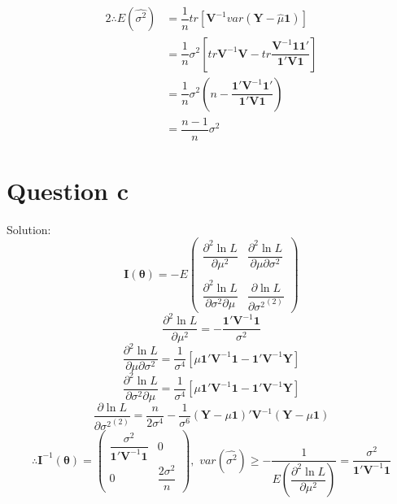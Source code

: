 \documentclass[a4papers]{ctexart}
\begin{document}
\begin{alignat*}{2}
    \therefore 
    E(\hat{\sigma^2})
    &=\dfrac {1}{n} tr\left[ \boldsymbol{V}^{-1}  var\left( \boldsymbol{Y}-\hat {\mu }\boldsymbol{1}\right) \right] \\
    &=\dfrac {1}{n}\sigma ^{2}\left[ tr\boldsymbol{V}^{-1}\boldsymbol{V}-tr\dfrac {\boldsymbol{V}^{-1}\boldsymbol{1}\boldsymbol{1}'}{\boldsymbol{1}'\boldsymbol{V}\boldsymbol{1}}\right] \\
    &=\dfrac{1}{n}\sigma^2\left( n-\dfrac{\boldsymbol{1}'\boldsymbol{V}^{-1}\boldsymbol{1}'}{\boldsymbol{1}'\boldsymbol{V}\boldsymbol{1}} \right)\\
    &= \dfrac{n-1}{n}\sigma^2
\end{alignat*}


\section*{Question c}
\noindent Solution:
\[ \boldsymbol{I}(\boldsymbol{\theta}) = -E \begin{pmatrix}
    \dfrac {\partial ^{2}\ln L}{\partial \mu^2} 
    & \dfrac {\partial^{2}\ln L}{\partial \mu \partial \sigma ^{2}} \\ \\
    \dfrac {\partial ^{2}\ln L}{\partial \sigma ^{2}\partial \mu } 
    & \dfrac {\partial \ln L}{\partial {\sigma ^{2}}^{(2)} }
\end{pmatrix}\]
\[  \dfrac {\partial ^{2}\ln L}{\partial \mu^2 }=-\dfrac {\boldsymbol{1}'\boldsymbol{V}^{-1}\boldsymbol{1}}{\sigma ^{2}} \]
\[ \dfrac {\partial^{2}\ln L}{\partial \mu \partial \sigma ^{2}}=\dfrac {1}{\sigma ^{4}}\left[ \mu \boldsymbol{1}'\boldsymbol{V}^{-1}\boldsymbol{1}-\boldsymbol{1}'\boldsymbol{V}^{-1}\boldsymbol{Y}\right] \]
\[ \dfrac {\partial ^{2}\ln L}{\partial \sigma ^{2}\partial \mu } = \dfrac {1}{\sigma ^{4}}\left[ \mu \boldsymbol{1}'\boldsymbol{V}^{-1}\boldsymbol{1}-\boldsymbol{1}'\boldsymbol{V}^{-1}\boldsymbol{Y}\right] \]
\[ \dfrac {\partial \ln L}{\partial {\sigma ^{2}}^{(2)} } =\dfrac {n}{2\sigma ^{4}}-\dfrac {1}{\sigma ^{6}}\left( \boldsymbol{Y}-\mu \boldsymbol{1}\right) '\boldsymbol{V}^{-1}\left( \boldsymbol{Y}-\mu \boldsymbol{1}\right)  \]
\[ \therefore \boldsymbol{I}^{-1}(\boldsymbol{\theta}) =\begin{pmatrix}
\dfrac{\sigma^2}{\boldsymbol{1}'\boldsymbol{V}^{-1}\boldsymbol{1}}   &   0        \\
0                             &   \dfrac{2\sigma^2}{n}
\end{pmatrix} ,\,\,
var(\hat{\sigma^2})\ge -\dfrac{1}{E\left(\dfrac {\partial ^{2}\ln L}{\partial \mu^2 }\right)} = \dfrac {\sigma ^{2}}{\boldsymbol{1}'\boldsymbol{V}^{-1}\boldsymbol{1}}
\]
\end{document}
